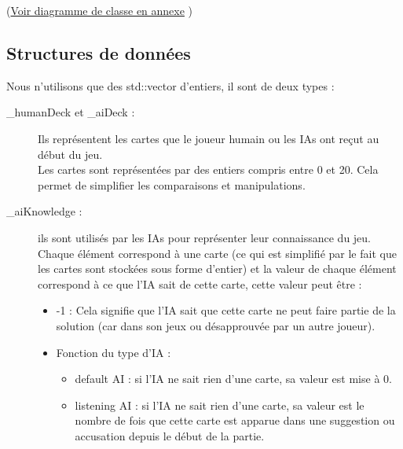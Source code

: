 \documentclass[a4paper,10pt]{article}
\begin{document}
		(\hyperlink{classDiag}{Voir diagramme de classe en annexe} )
	
	\subsection{Structures de données}
			Nous n'utilisons que des std::vector d'entiers, il sont de deux types :
			\begin{description}
				\item[\_humanDeck et \_aiDeck :] Ils représentent les cartes que le joueur humain ou les IAs ont reçut au début du jeu.\\
						Les cartes sont représentées par des entiers compris entre 0 et 20. Cela permet de simplifier les comparaisons et manipulations.
				\item[\_aiKnowledge :] ils sont utilisés par les IAs pour représenter leur connaissance du jeu.\\
						Chaque élément correspond à une carte (ce qui est simplifié par le fait que les cartes sont stockées sous forme d'entier) et la valeur de chaque élément correspond à ce que l'IA sait de cette carte, cette valeur peut être :
						\begin{itemize}
							\item -1 : Cela signifie que l'IA sait que cette carte ne peut faire partie de la solution (car dans son jeux ou désapprouvée par un autre joueur).
							\item Fonction du type d'IA :
								\begin{itemize}
									\item default AI : si l'IA ne sait rien d'une carte, sa valeur est mise à 0.
									\item listening AI : si l'IA ne sait rien d'une carte, sa valeur est le nombre de fois que cette carte est apparue dans une suggestion ou accusation depuis le début de la partie.
								\end{itemize}
						\end{itemize}
			\end{description}
	
\end{document}
